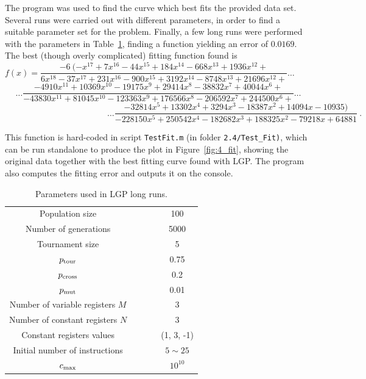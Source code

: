 \documentclass[12pt,titlepage]{article}
\begin{document}
\bigskip
The program was used to find the curve which best fits the provided data set. Several runs were carried out with different parameters, in order to find a suitable parameter set for the problem. Finally, a few long runs were performed with the parameters in Table~\ref{tab:4_parameters}, finding a function yielding an error of $0.0169$. The best (though overly complicated) fitting function found is
\[
f(x) = \dfrac{-6 \ (- x^{17} + 7 x^{16} - 44 x^{15} + 184 x^{14} - 668 x^{13} + 1936 x^{12} +}{6 x^{18} - 37 x^{17} + 231 x^{16} - 900 x^{15} + 3192 x^{14} - 8748 x^{13} + 21696 x^{12} + } \ldots \qquad \qquad \qquad \qquad
\]
\[
\ldots \dfrac{- 4910 x^{11} + 10369 x^{10} - 19175 x^{9} + 29414 x^{8} - 38832 x^{7} + 40044 x^6 +}{- 43830 x^{11} + 81045 x^{10} - 123363 x^9 + 176566 x^8 - 206592 x^7 + 244500 x^6 +} \ldots
\]
\[
\qquad \qquad \qquad \qquad \qquad \qquad \ldots \dfrac{- 32814 x^5 + 13302 x^4 + 3294 x^3 - 18387 x^2 + 14094 x - 10935)}{- 228150 x^5 + 250542 x^4 - 182682 x^3 + 188325 x^2 - 79218 x + 64881} \ .
\]

This function is hard-coded in script \texttt{TestFit.m} (in folder \texttt{2.4/Test\_Fit)}, which can be run standalone to produce the plot in Figure~\ref{fig:4_fit}, showing the original data together with the best fitting curve found with LGP. The program also computes the fitting error and outputs it on the console.

\begin{table}[hbtp]
\centering
\begin{tabular}{ccc}
\toprule
Population size  			& $\qquad$ & 100 \\
Number of generations			& 	& 5000\\
Tournament size					& 	& 5 \\
$p_{\textup{tour}}$					& & 0.75\\
$p_{\textup{cross}}$				& & 0.2\\
$p_{\textup{mut}}$					& & 0.01\\
Number of variable registers $M$	& & 3\\
Number of constant registers $N$	& & 3\\
Constant registers values			& & (1, 3, -1)\\
Initial number of instructions	& 	& $5\sim 25$\\
$c_{\textup{max}}$				& 	& $10^{10}$\\
\bottomrule
\end{tabular}
\caption{\footnotesize Parameters used in LGP long runs.}
\label{tab:4_parameters}
\end{table}
\end{document}
